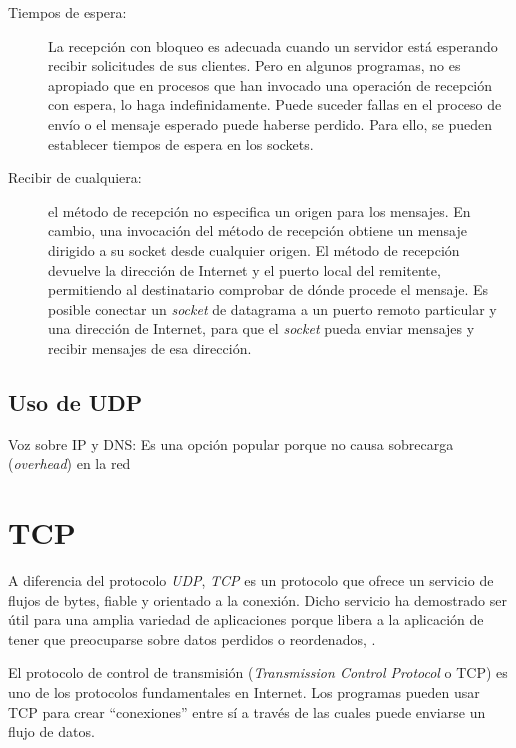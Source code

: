 \begin{description}
	\item[Tiempos de espera:]     La recepción con bloqueo   es adecuada cuando un servidor está esperando recibir solicitudes de sus clientes. Pero en algunos programas, no es apropiado que en procesos que han invocado una operación de recepción con espera, lo haga indefinidamente. Puede suceder fallas en el proceso de envío  o el mensaje esperado puede haberse	perdido. Para ello, se pueden establecer tiempos de espera en los sockets. 
	
	\item[Recibir de cualquiera:] el método de recepción no especifica un origen para los mensajes. En cambio, una invocación del m\'etodo de  recepci\'on obtiene un mensaje dirigido a su socket desde cualquier	origen. El método de recepción devuelve la dirección de Internet y el puerto local del remitente, 	permitiendo al destinatario comprobar de dónde procede el mensaje. Es posible conectar un \textit{socket} de datagrama a un puerto remoto particular y una dirección de Internet, para  que el \textit{socket} pueda enviar mensajes y recibir mensajes de esa direcci\'on. 
\end{description}
 

\subsection{Uso de UDP }  
Voz sobre IP y DNS:    Es una opción popular  porque no causa sobrecarga (\textit{overhead}) en la red
 

\section{TCP}
A diferencia del protocolo \textit{UDP}, \textit{TCP} es un protocolo que ofrece un servicio de flujos de bytes, fiable y orientado a la conexión. Dicho servicio ha demostrado ser útil para una amplia variedad de aplicaciones porque libera a la aplicación de tener que preocuparse sobre datos perdidos o reordenados, . 

El protocolo de control de transmisión (\textit{Transmission Control Protocol} o TCP) es uno de los protocolos fundamentales en Internet. Los programas  pueden usar TCP para crear “conexiones” entre sí a través de las cuales puede enviarse un flujo de datos.

